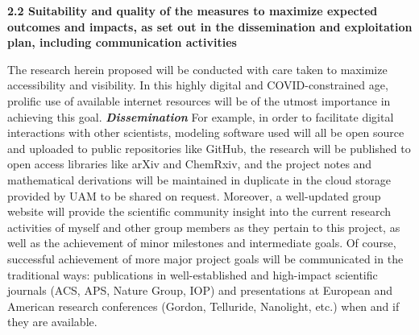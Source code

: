 \documentclass[11pt,a4paper]{article}
\begin{document}
\noindent\textbf{2.2 Suitability and quality of the measures to maximize expected outcomes and impacts, as set out in the dissemination and exploitation plan, including communication activities}

The research herein proposed will be conducted with care taken to maximize accessibility and visibility. In this highly digital and COVID-constrained age, prolific use of available internet resources will be of the utmost importance in achieving this goal. \textbf{\textit{Dissemination}} For example, in order to facilitate digital interactions with other scientists, modeling software used will all be open source and uploaded to public repositories like GitHub, the research will be published to open access libraries like arXiv and ChemRxiv, and the project notes and mathematical derivations will be maintained in duplicate in the cloud storage provided by UAM to be shared on request. Moreover, a well-updated group website will provide the scientific community insight into the current research activities of myself and other group members as they pertain to this project, as well as the achievement of minor milestones and intermediate goals. Of course, successful achievement of more major project goals will be communicated in the traditional ways: publications in well-established and high-impact scientific journals (ACS, APS, Nature Group, IOP) and presentations at European and American research conferences (Gordon, Telluride, Nanolight, etc.) when and if they are available.








\end{document}
